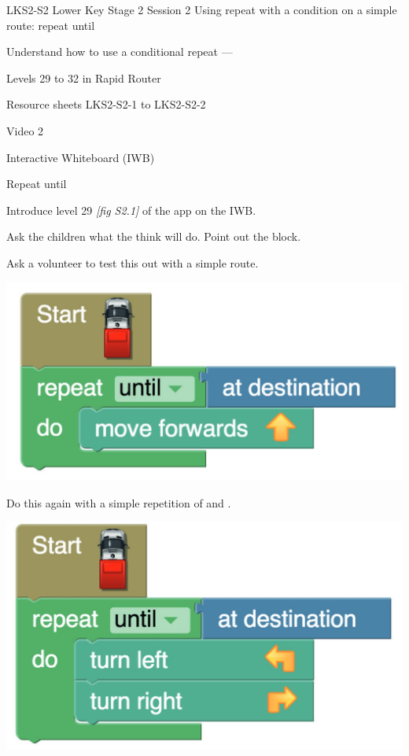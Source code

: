 \documentclass{../../../lessonplan}
\begin{document}
\lessonplantitle
    {LKS2-S2}
    {Lower Key Stage 2 Session 2}
    {Using repeat with a condition on a simple route: repeat until}

\preamble
    {
    \item Understand how to use a conditional repeat --- 
    }
    {
    \item Levels 29 to 32 in Rapid Router
    \item Resource sheets LKS2-S2-1 to LKS2-S2-2
    \item Video 2
    \item Interactive Whiteboard (IWB)
    }
    {
    \item Repeat until
    }

\begin{lessonplan}


Introduce level 29 \textit{[fig S2.1]} of the app on the IWB.

Ask the children what the think  will do.
Point out the  block.

Ask a volunteer to test this out with a simple route.

\includegraphics[width=\linewidth]{repeat_until1.jpg}

Do this again with a simple repetition of  and .

\includegraphics[width=\linewidth]{repeat_until2.jpg}


\end{lessonplan}
\end{document}
